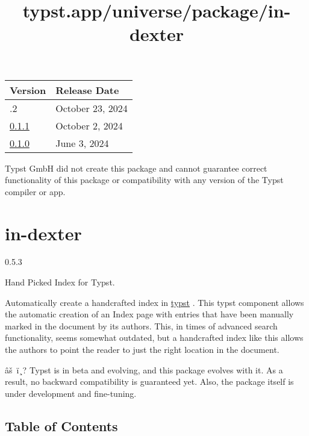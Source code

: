 \begin{longtable}[]{@{}ll@{}}
\toprule\noalign{}
Version & Release Date \\
\midrule\noalign{}
\endhead
\bottomrule\noalign{}
\endlastfoot
0.1.2 & October 23, 2024 \\
\href{https://typst.app/universe/package/nassi/0.1.1/}{0.1.1} & October
2, 2024 \\
\href{https://typst.app/universe/package/nassi/0.1.0/}{0.1.0} & June 3,
2024 \\
\end{longtable}

Typst GmbH did not create this package and cannot guarantee correct
functionality of this package or compatibility with any version of the
Typst compiler or app.


\title{typst.app/universe/package/in-dexter}

\label{banner}
\section{in-dexter}\label{in-dexter}

{ 0.5.3 }

Hand Picked Index for Typst.

\label{readme}
Automatically create a handcrafted index in
\href{https://typst.app/}{typst} . This typst component allows the
automatic creation of an Index page with entries that have been manually
marked in the document by its authors. This, in times of advanced search
functionality, seems somewhat outdated, but a handcrafted index like
this allows the authors to point the reader to just the right location
in the document.

âš~ï¸? Typst is in beta and evolving, and this package evolves with it.
As a result, no backward compatibility is guaranteed yet. Also, the
package itself is under development and fine-tuning.

\subsection{Table of Contents}\label{table-of-contents}

